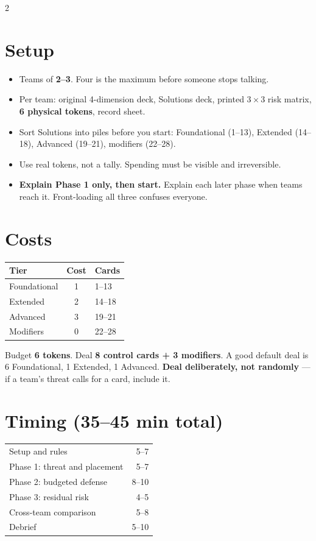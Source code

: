 \documentclass[9pt,letterpaper]{extarticle}
\begin{document}
\vspace{0.4em}
\begin{multicols}{2}

\section{Setup}
\begin{itemize}
\item Teams of \textbf{2--3}. Four is the maximum before someone stops talking.
\item Per team: original 4-dimension deck, Solutions deck, printed $3\times3$
risk matrix, \textbf{6 physical tokens}, record sheet.
\item Sort Solutions into piles before you start: Foundational (1--13),
Extended (14--18), Advanced (19--21), modifiers (22--28).
\item Use real tokens, not a tally. Spending must be visible and irreversible.
\item \textbf{Explain Phase 1 only, then start.} Explain each later phase when
teams reach it. Front-loading all three confuses everyone.
\end{itemize}

\section{Costs}
\small
\begin{tabularx}{\linewidth}{@{}l c X@{}}
\toprule
\textbf{Tier} & \textbf{Cost} & \textbf{Cards} \\
\midrule
Foundational & 1 & 1--13 \\
Extended & 2 & 14--18 \\
Advanced & 3 & 19--21 \\
Modifiers & 0 & 22--28 \\
\bottomrule
\end{tabularx}
\normalsize

\vspace{0.4em}
Budget \textbf{6 tokens}. Deal \textbf{8 control cards + 3 modifiers}. A good
default deal is 6 Foundational, 1 Extended, 1 Advanced. \textbf{Deal
deliberately, not randomly} --- if a team's threat calls for a card, include it.

\section{Timing (35--45 min total)}
\small
\begin{tabularx}{\linewidth}{@{}X r@{}}
\toprule
Setup and rules & 5--7 \\
Phase 1: threat and placement & 5--7 \\
Phase 2: budgeted defense & 8--10 \\
Phase 3: residual risk & 4--5 \\
Cross-team comparison & 5--8 \\
Debrief & 5--10 \\
\bottomrule
\end{tabularx}
\normalsize


\end{multicols}
\end{document}
